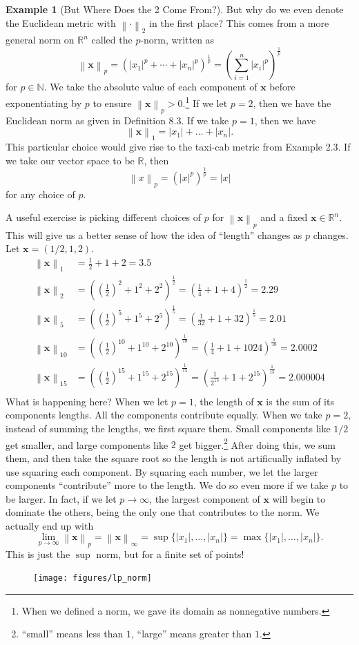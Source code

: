 \documentclass{article}
\newcommand{\N}{\mathbb{N}}
\newcommand{\R}{\mathbb{R}}
\newcommand{\x}{\mathbf{x}}
\newcommand{\norm}[1]{\left\lVert#1\right\rVert}
\theoremstyle{definition}
\newtheorem{example}{Example}[section]
\begin{document}
	\begin{example}[But Where Does the 2 Come From?]
		But why do we even denote the Euclidean metric with $ \norm{\cdot}_2 $ in the first place? This comes from a more general norm on $ \R^n $ called the $ p $-norm, written as $$ \norm{\x}_p=(|x_1|^p+\cdots + |x_n|^p)^\frac{1}{p}=\left(\sum_{i=1}^n|x_i|^p\right)^\frac{1}{p}$$ for $ p\in\N $. We take the absolute value of each component of $ \x $ before exponentiating by $ p $ to ensure $ \norm{\x}_p>0 $.\footnote{When we defined a norm, we gave its domain as nonnegative numbers.} If we let $ p=2 $, then we have the Euclidean norm as given in Definition 8.3. If we take $ p=1 $, then we have $$ \norm{\x}_1=|x_1|+\ldots+|x_n|.$$ This particular choice would give rise to the taxi-cab metric from Example 2.3. If we take our vector space to be $ \R $, then $$\norm{x}_p=\left(|x|^p \right)^\frac{1}{p}=|x|$$ for any choice of $ p $.
		
		A useful exercise is picking different choices of $ p $ for $ \norm{\x}_p $ and a fixed $ \x\in\R^n $. This will give us a better sense of how the idea of ``length'' changes as $ p $ changes. Let $ \x=(1/2,1,2) $.  
		\begin{align*}
			\norm{\x}_1&=\frac{1}{2}+1+2=3.5\\
			\norm{\x}_2&=\left(\left(\frac{1}{2}\right)^2+1^2+2^2\right)^\frac{1}{2}=\left(\frac{1}{4}+1+4\right)^\frac{1}{2}=2.29\\
			\norm{\x}_5&=\left(\left(\frac{1}{2}\right)^5+1^5+2^5\right)^\frac{1}{5}=\left(\frac{1}{32}+1+32\right)^\frac{1}{5}=2.01\\
			\norm{\x}_{10}&=\left(\left(\frac{1}{2}\right)^{10}+1^{10}+2^{10}\right)^\frac{1}{{10}}=\left(\frac{1}{4}+1+1024\right)^\frac{1}{{10}}=2.0002\\
			\norm{\x}_{15}&=\left(\left(\frac{1}{2}\right)^{15}+1^{15}+2^{15}\right)^\frac{1}{{15}}=\left(\frac{1}{2^{15}}+1+2^{15}\right)^\frac{1}{{15}}=2.000004\\
		\end{align*}  
		What is happening here? When we let $ p=1 $, the length of $ \x $ is the sum of its components lengths. All the components contribute equally. When we take $ p=2 $, instead of summing the lengths, we first square them. Small components like $ 1/2 $ get smaller, and large components like $ 2 $ get bigger.\footnote{``small'' means less than $ 1 $, ``large'' means greater than $ 1 $.} After doing this, we sum them, and then take the square root so the length is not artificually inflated by use squaring each component. By squaring each number, we let the larger components ``contribute'' more to the length. We do so even more if we take $ p $ to be larger. In fact, if we let $ p\to\infty $, the largest component of $ \x $ will begin to dominate the others, being the only one that contributes to the norm. We actually end up with $$ \lim\limits_{p\to\infty}\norm{\x}_p=\norm{\x}_\infty=\sup\{|x_1|,\ldots, |x_n|\}=\max\{|x_1|,\ldots, |x_n|\}. $$ This is just the $ \sup $ norm, but for a finite set of points! 
		\begin{figure}[h!]
			\centering
			\texttt{[image: figures/lp\_norm]}
			\caption{}
			\label{fig:lpnorm}
		\end{figure}
		

\end{example}
\end{document}
